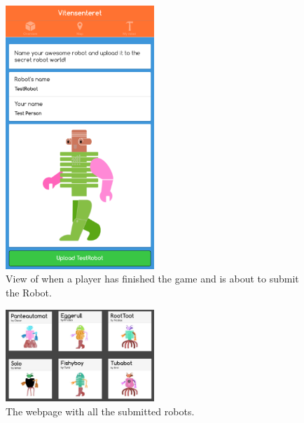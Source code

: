 \begin{figure}[H]
    \centering
    \includegraphics[width=0.5\textwidth]{images/app/finished.png}
    \caption{View of when a player has finished the game and is about to submit the Robot.}
    \label{fig:finished}
\end{figure}



\begin{figure}[H]
    \centering
    \includegraphics[width=0.5\textwidth]{images/app/robots_backend.jpg}
    \caption{The webpage with all the submitted robots.}
    \label{fig:robots_backend}
\end{figure}



